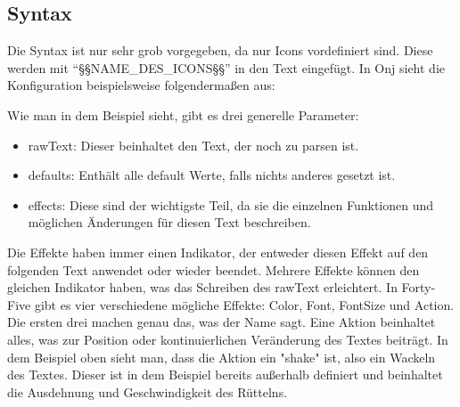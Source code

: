 
\renewcommand{\kapitelautor}{Autor: Felix Zwickelstorfer}
\subsection{Syntax}\label{subsec:syntax}
\renewcommand{\kapitelautor}{Autor: Felix Zwickelstorfer}

Die Syntax ist nur sehr grob vorgegeben, da nur Icons vordefiniert sind.
Diese werden mit ``\S\S NAME\_DES\_ICONS\S\S''  in den Text eingefügt.
In Onj sieht die Konfiguration beispielsweise folgendermaßen aus:

Wie man in dem Beispiel sieht, gibt es drei generelle Parameter:
\begin{itemize}
    \item rawText: Dieser beinhaltet den Text, der noch zu parsen ist.
    \item defaults: Enthält alle default Werte, falls nichts anderes gesetzt ist.
    \item effects: Diese sind der wichtigste Teil, da sie die einzelnen Funktionen und möglichen Änderungen für diesen Text beschreiben.
\end{itemize}

Die Effekte haben immer einen Indikator, der entweder diesen Effekt auf den folgenden Text anwendet oder wieder beendet.
Mehrere Effekte können den gleichen Indikator haben, was das Schreiben des rawText erleichtert.
In Forty-Five gibt es vier verschiedene mögliche Effekte: Color, Font, FontSize und Action.
Die ersten drei machen genau das, was der Name sagt.
Eine Aktion beinhaltet alles, was zur Position oder kontinuierlichen Veränderung des Textes beiträgt.
In dem Beispiel oben sieht man, dass die Aktion ein "shake" ist, also ein Wackeln des Textes.
Dieser ist in dem Beispiel bereits außerhalb definiert und beinhaltet die Ausdehnung und Geschwindigkeit des Rüttelns.